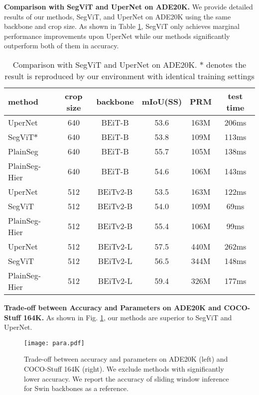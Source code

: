 \documentclass{article} \usepackage{iclr2024_conference,times}
\begin{document}
\textbf{Comparison with SegViT and UperNet on ADE20K.} We provide detailed results of our methods, SegViT, and UperNet on ADE20K using the same backbone and crop size. As shown in Table \ref{tab:12}, SegViT only achieves marginal performance improvements upon UperNet while our methods significantly outperform both of them in accuracy.

\begin{table}[h]
\caption{Comparison with SegViT \cite{zhang2022segvit} and UperNet on ADE20K. $\ast$ denotes the result is reproduced by our environment with identical training settings}
\begin{center}
\label{tab:12}
\begin{tabular}{l|ccccc}
\toprule
method & crop size & backbone   &mIoU(SS)  & PRM &test time \\\midrule
UperNet & 640  &BEiT-B &53.6 &163M &206ms \\
SegViT$\ast$ & 640  &BEiT-B &53.8 &109M &113ms \\
PlainSeg & 640 &BEiT-B & 55.7 &105M &138ms \\
PlainSeg-Hier & 640 &BEiT-B & 54.6 &106M &143ms \\\midrule
UperNet & 512  &BEiTv2-B &53.5 &163M &122ms \\
SegViT & 512  &BEiTv2-B &54.0 &109M &69ms \\
PlainSeg-Hier & 512 &BEiTv2-B & 55.4 &106M &99ms \\\midrule
UperNet & 512  &BEiTv2-L &57.5 &440M &262ms \\
SegViT & 512   &BEiTv2-L &56.5 &344M &148ms \\
PlainSeg-Hier & 512 &BEiTv2-L & 59.4 &326M &177ms \\
\bottomrule
\end{tabular}
\end{center}
\end{table}

\textbf{Trade-off between Accuracy and Parameters on ADE20K and COCO-Stuff 164K.} As shown in Fig. \ref{fig4}, our methods are superior to SegViT and UperNet.


\begin{figure}
  \centerline{\texttt{[image: para.pdf]}}
  \caption{Trade-off between accuracy and parameters on ADE20K (left) and COCO-Stuff 164K (right). We exclude methods with significantly lower accuracy. We report the accuracy of sliding window inference for Swin backbones as a reference.}
  \label{fig4}
\end{figure}
\end{document}
